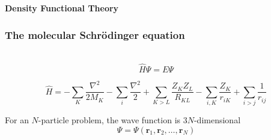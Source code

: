 \begin{frame}
    \centering
    \textbf{\Large{Density Functional Theory}}
\end{frame}

\begin{frame}
    \frametitle{The molecular Schr\"{o}dinger equation}
    \ \\
    {\large
    \begin{equation}
	\nonumber
	\hat{H}\Psi = E\Psi
    \end{equation}
    }

    \begin{equation}
	\nonumber
	\hat{H} =
        - \sum_K \frac{\nabla^2}{2M_K} - \sum_i \frac{\nabla^2}{2}
	+ \sum_{K>L} \frac{Z_K Z_L}{R_{KL}} 
	- \sum_{i,K} \frac{Z_K}{r_{iK}} 
	+ \sum_{i>j} \frac{1}{r_{ij}} 
    \end{equation}

    \vspace{5mm}

    \centering
    For an $N$-particle problem, the wave function is $3N$-dimensional
    \begin{equation}
	\nonumber
	\Psi = \Psi(\boldsymbol{r}_1,\boldsymbol{r}_2,\dots,\boldsymbol{r}_N)
    \end{equation}

    \vspace{5mm}


\end{frame}
